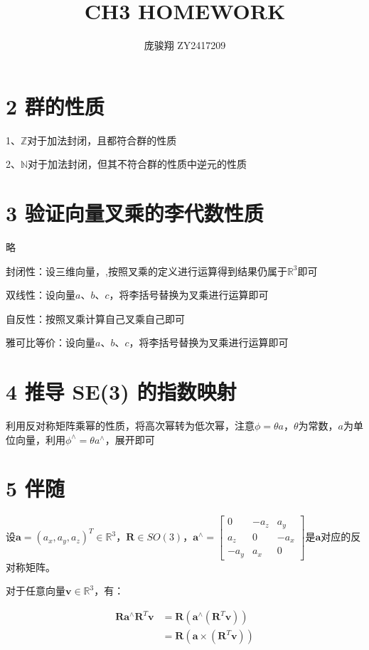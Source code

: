 \documentclass[12pt, a4paper, oneside]{ctexart}
\title{\vspace{-4cm}\bfseries{CH3 HOMEWORK}}
\author{\large 庞骏翔 \quad ZY2417209}  %
\date{}
\begin{document}
	
	\pagestyle{plain}
	\maketitle
	\section{2 群的性质}
	
	1、$\mathbb{Z}$对于加法封闭，且都符合群的性质
	
	2、$\mathbb{N}$对于加法封闭，但其不符合群的性质中逆元的性质
	
	\section{3 验证向量叉乘的李代数性质}
	
	略
	
	封闭性：设三维向量，,按照叉乘的定义进行运算得到结果仍属于$\mathbb{R}^{3}$即可
	
	双线性：设向量$a$、$b$、$c$，将李括号替换为叉乘进行运算即可
	
	自反性：按照叉乘计算自己叉乘自己即可
	
	雅可比等价：设向量$a$、$b$、$c$，将李括号替换为叉乘进行运算即可
	
	\section{4 推导 SE(3) 的指数映射}
	
	利用反对称矩阵乘幂的性质，将高次幂转为低次幂，注意$\phi=\theta a$，$\theta$为常数，$a$为单位向量，利用$\phi^{\wedge}=\theta a^{\wedge}$，展开即可
	
	\section{5 伴随}
	
	设\(\boldsymbol{a}=(a_x,a_y,a_z)^T\in\mathbb{R}^3\)，\(\boldsymbol{R}\in SO(3)\)，\(\boldsymbol{a}^{\wedge}=\begin{bmatrix}0& - a_z&a_y\\a_z&0& - a_x\\-a_y&a_x&0\end{bmatrix}\)是\(\boldsymbol{a}\)对应的反对称矩阵。
	
	对于任意向量\(\boldsymbol{v}\in\mathbb{R}^3\)，有：

	\begin{align}
		\boldsymbol{R}\boldsymbol{a}^{\wedge}\boldsymbol{R}^T\boldsymbol{v}&=\boldsymbol{R}(\boldsymbol{a}^{\wedge}(\boldsymbol{R}^T\boldsymbol{v}))\\
		&=\boldsymbol{R}(\boldsymbol{a}\times(\boldsymbol{R}^T\boldsymbol{v}))
	\end{align}
	
\end{document}
